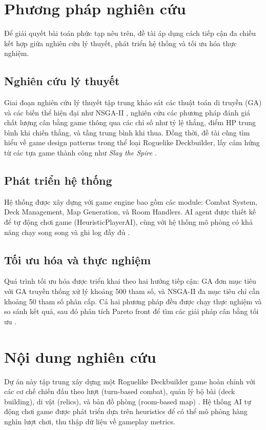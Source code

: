 \section{Phương pháp nghiên cứu}

Để giải quyết bài toán phức tạp nêu trên, đề tài áp dụng cách tiếp cận đa chiều kết hợp giữa nghiên cứu lý thuyết, phát triển hệ thống và tối ưu hóa thực nghiệm.

\subsection{Nghiên cứu lý thuyết}
Giai đoạn nghiên cứu lý thuyết tập trung khảo sát các thuật toán di truyền (GA) và các biến thể hiện đại như NSGA-II \cite{deb2002fast, zitzler2000comparison}, nghiên cứu các phương pháp đánh giá chất lượng cân bằng game thông qua các chỉ số như tỷ lệ thắng, điểm HP trung bình khi chiến thắng, và tầng trung bình khi thua. Đồng thời, đề tài cũng tìm hiểu về game design patterns trong thể loại Roguelike Deckbuilder, lấy cảm hứng từ các tựa game thành công như \textit{Slay the Spire} \cite{slaythespire}.

\subsection{Phát triển hệ thống}
Hệ thống được xây dựng với game engine bao gồm các module: Combat System, Deck Management, Map Generation, và Room Handlers. AI agent được thiết kế để tự động chơi game (HeuristicPlayerAI), cùng với hệ thống mô phỏng có khả năng chạy song song và ghi log đầy đủ \cite{yannakakis2018artificial}.

\subsection{Tối ưu hóa và thực nghiệm}
Quá trình tối ưu hóa được triển khai theo hai hướng tiếp cận: GA đơn mục tiêu với GA truyền thống xử lý khoảng 500 tham số, và NSGA-II đa mục tiêu chỉ cần khoảng 50 tham số phân cấp. Cả hai phương pháp đều được chạy thực nghiệm và so sánh kết quả, sau đó phân tích Pareto front để tìm các giải pháp cân bằng tối ưu \cite{preuss2012multiobjective}.

\section{Nội dung nghiên cứu}

Dự án này tập trung xây dựng một Roguelike Deckbuilder game hoàn chỉnh với các cơ chế chiến đấu theo lượt (turn-based combat), quản lý bộ bài (deck building), di vật (relics), và bản đồ phòng (room-based map) \cite{dormans2011level}. Hệ thống AI tự động chơi game được phát triển dựa trên heuristics để có thể mô phỏng hàng nghìn lượt chơi, thu thập dữ liệu về gameplay metrics.

